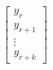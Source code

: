 $$\begin{matrix}
\begin{bmatrix}
                                                                                                         y_{r} \\
                                                                                                         y_{r+1} \\
                                                                                                         \vdots \\
                                                                                                         y_{r+k}
                                                                                                        \end{bmatrix}\\

\end{matrix}
$$

